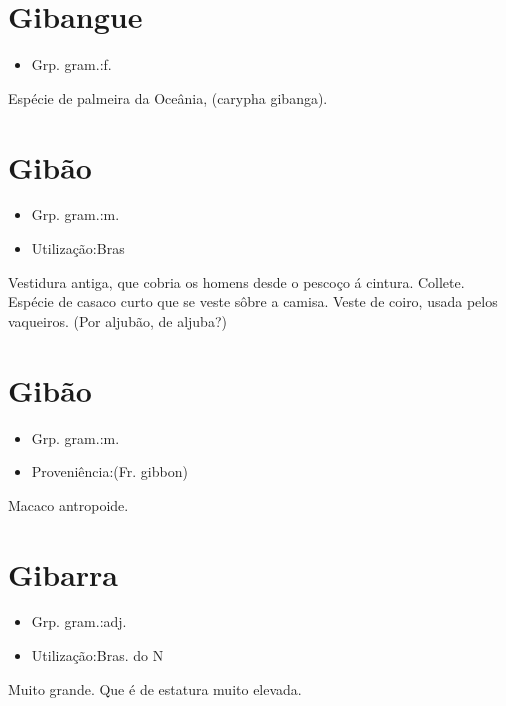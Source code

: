 \section{Gibangue}
\begin{itemize}
\item {Grp. gram.:f.}
\end{itemize}
Espécie de palmeira da Oceânia, (\textunderscore carypha gibanga\textunderscore ).
\section{Gibão}
\begin{itemize}
\item {Grp. gram.:m.}
\end{itemize}
\begin{itemize}
\item {Utilização:Bras}
\end{itemize}
Vestidura antiga, que cobria os homens desde o pescoço á cintura.
Collete.
Espécie de casaco curto que se veste sôbre a camisa.
Veste de coiro, usada pelos vaqueiros.
(Por \textunderscore aljubão\textunderscore , de \textunderscore aljuba\textunderscore ?)
\section{Gibão}
\begin{itemize}
\item {Grp. gram.:m.}
\end{itemize}
\begin{itemize}
\item {Proveniência:(Fr. \textunderscore gibbon\textunderscore )}
\end{itemize}
Macaco antropoide.
\section{Gibarra}
\begin{itemize}
\item {Grp. gram.:adj.}
\end{itemize}
\begin{itemize}
\item {Utilização:Bras. do N}
\end{itemize}
Muito grande.
Que é de estatura muito elevada.
